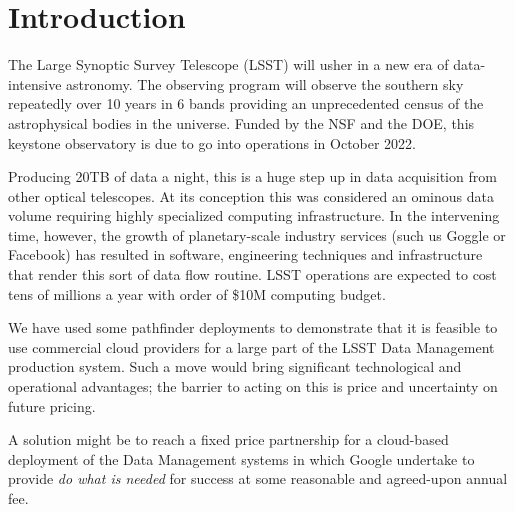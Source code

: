 \section{Introduction}
The Large Synoptic Survey Telescope (\gls{LSST}) will usher in a new era of data-intensive astronomy. The observing program will observe the southern sky repeatedly over 10 years in 6 bands providing an unprecedented census of the astrophysical bodies in the universe.  Funded by the \gls{NSF} and the \gls{DOE}, this keystone observatory is due to go into operations in October 2022.

Producing 20TB of data a night, this is a huge step up in data acquisition from other optical telescopes. At its conception this was considered an ominous data volume requiring highly specialized computing infrastructure. In the intervening time, however, the growth of planetary-scale industry services (such us Goggle or Facebook) has resulted in software, engineering techniques and infrastructure that render this sort of data flow routine. \gls{LSST}  operations are expected to cost tens of millions a year with order of \$10M computing budget.

We have used some pathfinder deployments to demonstrate that it is feasible to use commercial cloud providers for a large part  of the \gls{LSST} \gls{Data Management} production system. Such a move would bring significant technological and operational advantages; the barrier to acting on this is price and uncertainty on future pricing.

A solution might be to reach a fixed price partnership for a cloud-based deployment of the \gls{Data Management} systems in which Google undertake to provide \emph{do what is needed} for success at some reasonable and agreed-upon annual fee.






